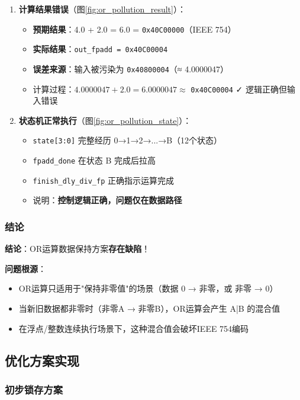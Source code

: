 \documentclass[12pt,a4paper]{article}
\begin{document}
\begin{enumerate}[itemsep=0pt, parsep=3pt]
    \item \textbf{计算结果错误}（图\ref{fig:or_pollution_result}）：
    \begin{itemize}[itemsep=0pt, parsep=3pt]
        \item \textbf{预期结果}：4.0 + 2.0 = 6.0 = \texttt{0x40C00000}（IEEE 754）
        \item \textbf{实际结果}：\texttt{out\_fpadd = 0x40C00004}
        \item \textbf{误差来源}：输入被污染为 \texttt{0x40800004}（≈ 4.0000047）
        \item 计算过程：$4.0000047 + 2.0 = 6.0000047 \approx$ \texttt{0x40C00004} ✓ 逻辑正确但输入错误
    \end{itemize}
    
    \item \textbf{状态机正常执行}（图\ref{fig:or_pollution_state}）：
    \begin{itemize}[itemsep=0pt, parsep=3pt]
        \item \texttt{state[3:0]} 完整经历 0→1→2→...→B（12个状态）
        \item \texttt{fpadd\_done} 在状态 B 完成后拉高
        \item \texttt{finish\_dly\_div\_fp} 正确指示运算完成
        \item 说明：\textbf{控制逻辑正确，问题仅在数据路径}
    \end{itemize}
\end{enumerate}

\subsubsection{结论}

\textbf{结论}：OR运算数据保持方案\textbf{存在缺陷}！

\textbf{问题根源}：
\begin{itemize}[itemsep=0pt, parsep=3pt]
    \item OR运算只适用于"保持非零值"的场景（数据 0 → 非零，或 非零 → 0）
    \item 当新旧数据都非零时（非零A → 非零B），OR运算会产生 A|B 的混合值
    \item 在浮点/整数连续执行场景下，这种混合值会破坏IEEE 754编码
\end{itemize}
\clearpage
\subsection{优化方案实现}

\subsubsection{初步锁存方案}
\end{document}

